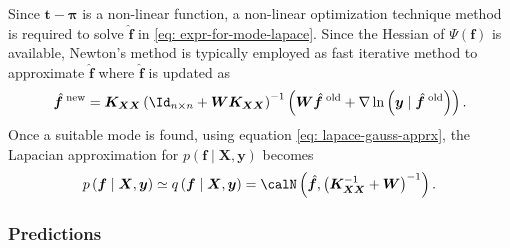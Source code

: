 Since $\bm{t} - \bm{\pi}$ is a non-linear function, a non-linear optimization technique method is required to solve $\hat{\bm{f}}$ in \ref{eq: expr-for-mode-lapace}. Since the Hessian of $\Psi \left( \bm{f} \right)$ is available, Newton's method is typically employed as fast iterative method to approximate $\hat{\bm{f}}$ where $\hat{\bm{f}}$ is updated as
\begin{equation*}
    \hat{\bm{f}}^{\; \text{new}} = \bm{K}_{\bm{X} \bm{X}} \left( \Id_{n \times n} + \bm{W} \bm{K}_{\bm{X} \bm{X}} \right)^{-1} \left( \bm{W} \hat{\bm{f}}^{\; \text{old}} + \nabla \ln \left( \bm{y} \mid \hat{\bm{f}}^{\; \text{old}} \right) \right).
\end{equation*}
Once a suitable mode is found, using equation \ref{eq: lapace-gauss-apprx}, the Lapacian approximation for $p \left( \bm{f} \mid \bm{X} , \bm{y} \right)$ becomes
\begin{equation} \label{eq: lapace-apprx}
    p \left( \bm{f} \mid \bm{X} , \bm{y} \right) \simeq q \left( \bm{f} \mid \bm{X} , \bm{y} \right) = \calN \left( \hat{\bm{f}} , \left( \bm{K}_{\bm{X} \bm{X}}^{-1} + \bm{W} \right)^{-1} \right).
\end{equation}

\subsubsection{Predictions}\label{Section1.6.3}


